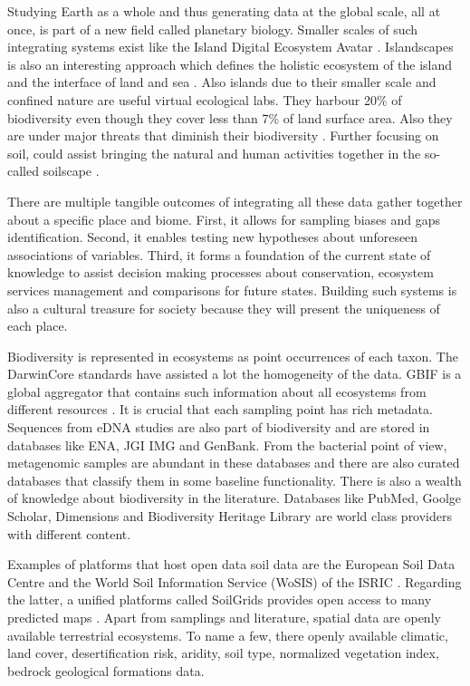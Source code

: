 Studying Earth as a whole and thus generating data at the global scale, all at once,
is part of a new field called planetary biology. Smaller scales of such integrating systems exist like
the Island Digital Ecosystem Avatar \parencite{Davies2016}. Islandscapes 
is also an interesting approach which defines the holistic ecosystem of the island
and the interface of land and sea \parencite{Vogiatzakis_land_2017}. Also islands
due to their smaller scale and confined nature are useful virtual ecological labs. They harbour 20\% of 
biodiversity even though they cover less than 7\% of land surface area. Also they are under major threats 
that diminish their biodiversity \parencite{fernandez-palacios2021scientists}.
Further focusing on soil, could assist bringing the natural and human activities 
together in the so-called soilscape \parencite{LAGACHERIE2001105}.

There are multiple tangible outcomes of integrating all these data gather together about a
specific place and biome. First, it allows for sampling biases and gaps identification. Second, 
it enables testing new hypotheses about unforeseen associations of variables. Third, 
it forms a foundation of the current state of knowledge to assist decision making 
processes about conservation, ecosystem services management and comparisons for 
future states. Building such systems is also a cultural treasure for society because
they will present the uniqueness of each place.

Biodiversity is represented in ecosystems as point occurrences of each taxon. The
DarwinCore standards have assisted a lot the homogeneity of the data. GBIF is a 
global aggregator that contains such information about all ecosystems from 
different resources \parencite{noauthor_gbif_nodate}. It is crucial that each sampling point has rich metadata. 
Sequences from eDNA studies are also part of biodiversity and are stored in 
databases like ENA, JGI IMG and GenBank.
From the bacterial point of view, metagenomic samples are abundant in these 
databases and there are also curated databases that classify them in some baseline functionality. 
There is also a wealth of knowledge about biodiversity in the literature. 
Databases like PubMed, Goolge Scholar, Dimensions and Biodiversity Heritage Library 
are world class providers with different content.

Examples of platforms that host open data soil data are the 
European Soil Data Centre \parencite{Panagos2022} and the World Soil Information
Service (WoSIS) of the ISRIC \parencite{Batjes2024}. Regarding the latter, a unified
platforms called SoilGrids provides open access to many predicted maps \parencite{poggio-soil-7-217-2021}.
Apart from samplings and literature,
spatial data are openly available terrestrial ecosystems.
To name a few, there openly available climatic, land cover, desertification risk, aridity, soil type, normalized
vegetation index, bedrock geological formations data.

